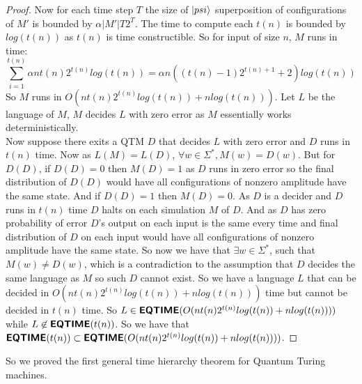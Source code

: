 \documentclass[11pt,a4paper]{article}
\newcommand{\classX}[1]{\ensuremath{\text{\textsf{\textbf{#1}}}}}
\newcommand{\EQ}{\classX{EQTIME}}
\begin{document}
\begin{proof}
        Now for each time step $T$ the size of $\ket{psi}$ superposition of configurations of $M'$ is bounded by $\alpha |M'|T2^T$. The time to compute each $t(n)$ is bounded by $log(t(n))$ as $t(n)$ is time constructible.
        So for input of size $n$, $M$ runs in time:
        $$\sum\limits_{i=1}^{t(n)}\alpha nt(n)2^{t(n)}log(t(n)) = \alpha n((t(n)-1)2^{t(n)+1} + 2)log(t(n))$$ 
        So $M$ runs in $O(nt(n)2^{t(n)}log(t(n))+nlog(t(n)))$. Let $L$ be the language of $M$, $M$ decides $L$ with zero error as $M$ essentially works deterministically.
        \\Now suppose there exits a QTM $D$ that decides $L$ with zero error and $D$ runs in $t(n)$ time.
        Now as $L(M) = L(D)$, $\forall w \in \Sigma^*, M(w) = D(w)$. But for $D(D)$, if $D(D) = 0$ then $M(D) = 1$ as $D$ runs in zero error so the final distribution of $D(D)$ would have all configurations of nonzero amplitude have the same state.
        And if $D(D) = 1$ then $M(D) = 0$. As $D$ is a decider and $D$ runs in $t(n)$ time $D$ halts on each simulation $M$ of $D$. And as $D$ has zero probability of error $D$'s output on each input is the same every time and final distribution of $D$ on each input would have all configurations of nonzero amplitude have the same state.
        So now we have that $\exists w \in \Sigma^*$, such that $M(w) \neq D(w)$, which is a contradiction to the assumption that $D$ decides the same language as $M$ so such $D$ cannot exist.
        So we have a language $L$ that can be decided in $O(nt(n)2^{t(n)}log(t(n))+nlog(t(n)))$ time but cannot be decided in $t(n)$ time. 
        So $L \in \EQ(O(nt(n)2^{t(n)}log(t(n))+nlog(t(n))))$ while $L \not\in \EQ(t(n))$.
        So we have that $\EQ(t(n)) \subset \EQ(O(nt(n)2^{t(n)}log(t(n))+nlog(t(n))))$.
    \end{proof}
    So we proved the first general time hierarchy theorem for Quantum Turing machines. 
\end{document}
